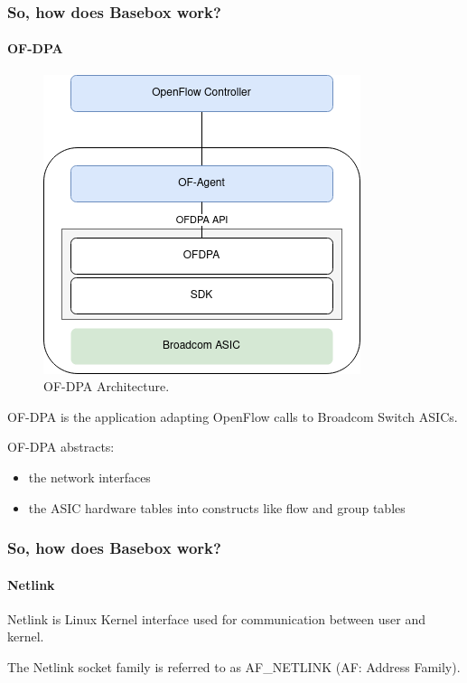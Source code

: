 \documentclass[11pt]{beamer}
\begin{document}
\begin{frame}

\end{frame}

\begin{frame}
\frametitle{So, how does Basebox work?}
\framesubtitle{OF-DPA}

\begin{minipage}[t]{0.48\linewidth}
\begin{figure}
\includegraphics[scale=0.3]{of-controller-switch.png}
\caption{OF-DPA Architecture.}

\end{figure}
\end{minipage}\hfill
\begin{minipage}[t]{0.48\linewidth}

   	OF-DPA is the application adapting OpenFlow calls to Broadcom Switch ASICs. 
	
	OF-DPA abstracts:

	\begin{itemize}
	\item the network interfaces
	\item the ASIC hardware tables into constructs like flow and group tables
	\end{itemize}
\end{minipage}\hfill

\end{frame}

\begin{frame}
\frametitle{So, how does Basebox work?}
\framesubtitle{Netlink}

Netlink is Linux Kernel interface used for communication between user and kernel.

The Netlink socket family is referred to as AF\_NETLINK (AF: Address Family).

\end{frame}
\end{document}
